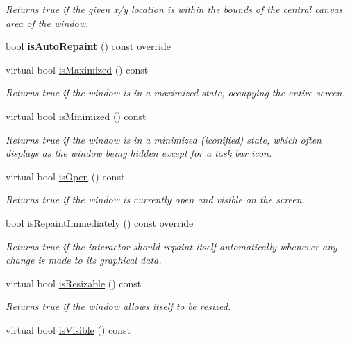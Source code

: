 \begin{DoxyCompactItemize}
\begin{DoxyCompactList}\small\item\em Returns true if the given x/y location is within the bounds of the central canvas area of the window. \end{DoxyCompactList}\item 
bool {\bfseries is\+Auto\+Repaint} () const override
\item 
virtual bool \mbox{\hyperlink{classGWindow_a28e910de88f3ff5419710b0b0a03c2bb}{is\+Maximized}} () const
\begin{DoxyCompactList}\small\item\em Returns true if the window is in a maximized state, occupying the entire screen. \end{DoxyCompactList}\item 
virtual bool \mbox{\hyperlink{classGWindow_a14e6f95fa2c9ec543caa7f16f30c53d6}{is\+Minimized}} () const
\begin{DoxyCompactList}\small\item\em Returns true if the window is in a minimized (iconified) state, which often displays as the window being hidden except for a task bar icon. \end{DoxyCompactList}\item 
virtual bool \mbox{\hyperlink{classGWindow_a002ed331862370f434b7befe331b5a0b}{is\+Open}} () const
\begin{DoxyCompactList}\small\item\em Returns true if the window is currently open and visible on the screen. \end{DoxyCompactList}\item 
bool \mbox{\hyperlink{classGWindow_a45b1955433b8bf8a449a216b847d87f7}{is\+Repaint\+Immediately}} () const override
\begin{DoxyCompactList}\small\item\em Returns true if the interactor should repaint itself automatically whenever any change is made to its graphical data. \end{DoxyCompactList}\item 
virtual bool \mbox{\hyperlink{classGWindow_a2afeea3d26d063fa35c104e73275cec7}{is\+Resizable}} () const
\begin{DoxyCompactList}\small\item\em Returns true if the window allows itself to be resized. \end{DoxyCompactList}\item 
virtual bool \mbox{\hyperlink{classGWindow_a9d8a6cfb13917785c143e74d40e4e2be}{is\+Visible}} () const

\end{DoxyCompactItemize}
